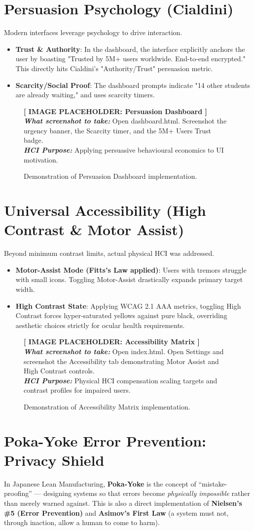 \documentclass[12pt,a4paper]{article}
\newcommand{\imageplaceholder}[3]{
    \begin{figure}[H]
        \centering
        \begin{tcolorbox}[colback=placeholderbg,colframe=placeholderborder,arc=4mm,height=7.5cm,valign=center,halign=center]
            {\Large\textbf{\textcolor{hciblue}{[ IMAGE PLACEHOLDER: #1 ]}}}\\[0.5cm]
            \textit{\textbf{What screenshot to take:}} #2\\[0.3cm]
            \textit{\textbf{HCI Purpose:}} #3
        \end{tcolorbox}
        \caption{Demonstration of #1 implementation.}
    \end{figure}
}
\begin{document}
\section{Persuasion Psychology (Cialdini)}
Modern interfaces leverage psychology to drive interaction.
\begin{itemize}
    \item \textbf{Trust \& Authority}: In the dashboard, the interface explicitly anchors the user by boasting "Trusted by 5M+ users worldwide. End-to-end encrypted." This directly hits Cialdini's "Authority/Trust" persuasion metric.
    \item \textbf{Scarcity/Social Proof}: The dashboard prompts indicate "14 other students are already waiting," and uses scarcity timers.
\end{itemize}
\imageplaceholder{Persuasion Dashboard}{Open dashboard.html. Screenshot the urgency banner, the Scarcity timer, and the 5M+ Users Trust badge.}{Applying persuasive behavioural economics to UI motivation.}

\section{Universal Accessibility (High Contrast \& Motor Assist)}
Beyond minimum contrast limits, actual physical HCI was addressed.
\begin{itemize}
    \item \textbf{Motor-Assist Mode (Fitts's Law applied)}: Users with tremors struggle with small icons. Toggling Motor-Assist drastically expands primary target width.
    \item \textbf{High Contrast State}: Applying WCAG 2.1 AAA metrics, toggling High Contrast forces hyper-saturated yellows against pure black, overriding aesthetic choices strictly for ocular health requirements.
\end{itemize}
\imageplaceholder{Accessibility Matrix}{Open index.html. Open Settings and screenshot the Accessibility tab demonstrating Motor Assist and High Contrast controls.}{Physical HCI compensation scaling targets and contrast profiles for impaired users.}

\section{Poka-Yoke Error Prevention: Privacy Shield}
In Japanese Lean Manufacturing, \textbf{Poka-Yoke} is the concept of ``mistake-proofing'' — designing systems so that errors become \textit{physically impossible} rather than merely warned against. This is also a direct implementation of \textbf{Nielsen's \#5 (Error Prevention)} and \textbf{Asimov's First Law} (a system must not, through inaction, allow a human to come to harm).
\end{document}
